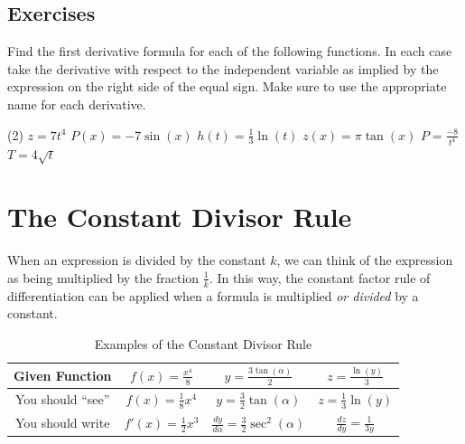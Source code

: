 \documentclass[10pt,oneside,]{book}
\theoremstyle{plain}
\theoremstyle{definition}
\numberwithin{equation}{section}
\newcommand{\fe}[2]{#1\mathopen{}\left(#2\right)\mathclose{}}
\newcommand{\fd}[1]{#1'}
\newcommand{\lz}[2]{\frac{d#1}{d#2}}
\begin{document}
\subsection[Exercises]{Exercises}\label{exercises-34}
Find the first derivative formula for each of the following functions.  In each case take the derivative with respect to the independent variable as implied by the expression on the right side of the equal sign.  Make sure to use the appropriate name for each derivative.%
\par
\begin{exercisegroup}(2)
\exercise[1.]\hypertarget{exercise-357}{\null}\(z=7t^4\)%
\exercise[2.]\hypertarget{exercise-358}{\null}\(\fe{P}{x}=-7\fe{\sin}{x}\)%
\exercise[3.]\hypertarget{exercise-359}{\null}\(\fe{h}{t}=\frac{1}{3}\fe{\ln}{t}\)%
\exercise[4.]\hypertarget{exercise-360}{\null}\(\fe{z}{x}=\pi\fe{\tan}{x}\)%
\exercise[5.]\hypertarget{exercise-361}{\null}\(P=\frac{-8}{t^4}\)%
\exercise[6.]\hypertarget{exercise-362}{\null}\(T=4\sqrt{t}\)%
\end{exercisegroup}
\par\smallskip\noindent
\typeout{************************************************}
\typeout{************************************************}
\section[The Constant Divisor Rule]{The Constant Divisor Rule}\label{section-constant-divisor-rule}
When an expression is divided by the constant \(k\), we can think of the expression as being multiplied by the fraction \(\frac{1}{k}\).  In this way, the constant factor rule of differentiation can be applied when a formula is multiplied \emph{or divided} by a constant.%
\begin{table}
\centering
\caption{Examples of the Constant Divisor Rule\label{table-constant-divisor-rule}}
\begin{tabular}{c|c|c|c}
\toprule
Given Function&\(\fe{f}{x}=\frac{x^4}{8}\)&\(y=\frac{3\fe{\tan}{\alpha}}{2}\)&\(z=\frac{\fe{\ln}{y}}{3}\)\\
\midrule
You should ``see''&\(\fe{f}{x}=\frac{1}{8}x^4\)&\(y=\frac{3}{2}\fe{\tan}{\alpha}\)&\(z=\frac{1}{3}\fe{\ln}{y}\)\\
\midrule
You should write&\(\fe{\fd{f}}{x}=\frac{1}{2}x^3\)&\(\lz{y}{\alpha}=\frac{3}{2}\fe{\sec^2}{\alpha}\)&\(\lz{z}{y}=\frac{1}{3y}\)\\
\bottomrule
\end{tabular}
\end{table}
\typeout{************************************************}
\typeout{************************************************}
\end{document}
